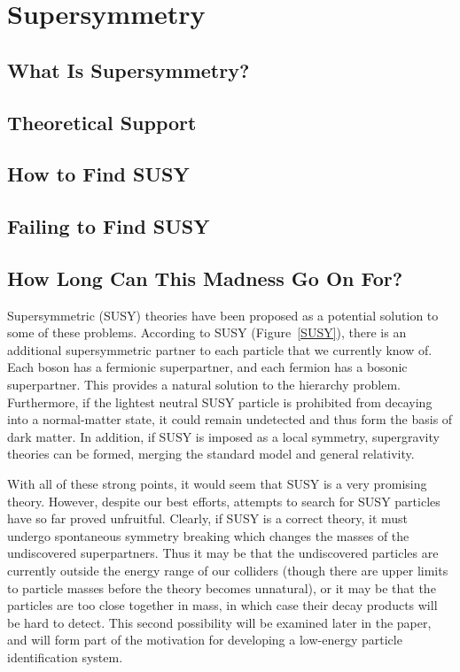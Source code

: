 \chapter{Supersymmetry}\label{chap:SUSY}

\section{What Is Supersymmetry?}

\section{Theoretical Support}

\section{How to Find SUSY}

\section{Failing to Find SUSY}

\section{How Long Can This Madness Go On For?}


Supersymmetric (SUSY) theories have been proposed as a potential solution to some of these problems. According to SUSY (Figure~\ref{SUSY}), there is an additional supersymmetric partner to each particle that we currently know of. Each boson has a fermionic superpartner, and each fermion has a bosonic superpartner. This provides a natural solution to the hierarchy problem. Furthermore, if the lightest neutral SUSY particle is prohibited from decaying into a normal-matter state, it could remain undetected and thus form the basis of dark matter. In addition, if SUSY is imposed as a local symmetry, supergravity theories can be formed, merging the standard model and general relativity.

With all of these strong points, it would seem that SUSY is a very promising theory. However, despite our best efforts, attempts to search for SUSY particles have so far proved unfruitful. Clearly, if SUSY is a correct theory, it must undergo spontaneous symmetry breaking which changes the masses of the undiscovered superpartners. Thus it may be that the undiscovered particles are currently outside the energy range of our colliders (though there are upper limits to particle masses before the theory becomes unnatural), or it may be that the particles are too close together in mass, in which case their decay products will be hard to detect. This second possibility will be examined later in the paper, and will form part of the motivation for developing a low-energy particle identification system.